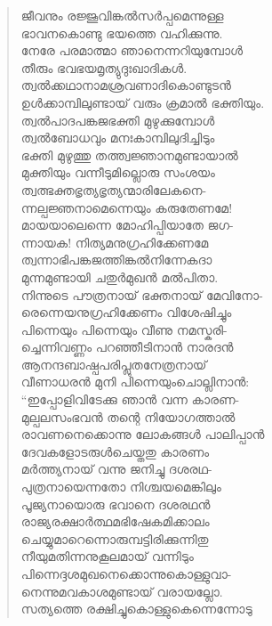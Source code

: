 \begin{verse}
ജീവനും രജ്ജൂവിങ്കല്‍സര്‍പ്പമെന്നുള്ള\\
ഭാവനകൊണ്ടു ഭയത്തെ വഹിക്കുന്നു.\\
നേരേ പരമാത്മാ ഞാനെന്നറിയുമ്പോള്‍\\
തീരും ഭവഭയമൃത്യുദുഃഖാദികള്‍.\\
ത്വല്‍ക്കഥാനാമശ്രവണാദികൊണ്ടുടന്‍\\
ഉള്‍ക്കാമ്പിലുണ്ടായ് വരും ക്രമാല്‍ ഭക്തിയും.\\
ത്വല്‍പാദപങ്കജഭക്തി മുഴുക്കുമ്പോള്‍\\
ത്വല്‍ബോധവും മനഃകാമ്പിലുദിച്ചിടും\\
ഭക്തി മുഴുത്തു തത്ത്വജ്ഞാനമുണ്ടായാല്‍\\
മുക്തിയും വന്നീടുമില്ലൊരു സംശയം\\
ത്വത്ഭക്തഭൃത്യഭൃത്യന്മാരിലേകനെ-\\
ന്നല്പജ്ഞനാമെന്നെയും കരുതേണമേ!\\
മായയാലെന്നെ മോഹിപ്പിയാതേ ജഗ-\\
ന്നായക! നിത്യമനുഗ്രഹിക്കേണമേ\\
ത്വന്നാഭിപങ്കജത്തിങ്കല്‍നിന്നേകദാ\\
മുന്നമുണ്ടായി ചതുര്‍മുഖന്‍ മല്‍പിതാ.\\
നിന്നുടെ പൗത്രനായ് ഭക്തനായ് മേവിനോ-\\
രെന്നെയനുഗ്രഹിക്കേണം വിശേഷിച്ചും\\
പിന്നെയും പിന്നെയും വീണു നമസ്കരി-\\
ച്ചെന്നിവണ്ണം പറഞ്ഞീടിനാന്‍ നാരദന്‍\\
ആനന്ദബാഷ്പപരിപ്ലുതനേത്രനായ്\\
വീണാധരന്‍ മുനി പിന്നെയുംചൊല്ലിനാന്‍:\\
“ഇപ്പോളിവിടേക്കു ഞാന്‍ വന്ന കാരണ-\\
മുല്പലസംഭവന്‍ തന്റെ നിയോഗത്താല്‍\\
രാവണനെക്കൊന്നു ലോകങ്ങള്‍ പാലിപ്പാന്‍\\
ദേവകളോടരുള്‍ചെയ്തതു കാരണം\\
മര്‍ത്ത്യനായ് വന്നു ജനിച്ചു ദശരഥ-\\
പുത്രനായെന്നതോ നിശ്ചയമെങ്കിലും\\
പൂജ്യനായൊരു ഭവാനെ ദശരഥന്‍\\
രാജ്യരക്ഷാര്‍ത്ഥമഭിഷേകമിക്കാലം\\
ചെയ്യുമാറെന്നൊരുമ്പട്ടിരിക്കുന്നിതു\\
നീയുമതിന്നനുകൂലമായ് വന്നിടും\\
പിന്നെദ്ദശമുഖനെക്കൊന്നുകൊള്ളുവാ-\\
നെന്നുമവകാശമുണ്ടായ് വരായല്ലോ.\\
സത്യത്തെ രക്ഷിച്ചുകൊള്ളുകെന്നെന്നോടു\\

\end{verse}
